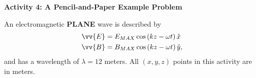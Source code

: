 \pagebreak[2]


\textbf{Activity 4: A Pencil-and-Paper Example Problem}

An electromagnetic \textbf{PLANE} wave is described by
\begin{align*}
\vv {E} &= E_{MAX} \cos \left ( kz - \omega t \right ) \hat x\\
\vv {B} &= B_{MAX} \cos \left ( kz - \omega t \right ) \hat y,
\end{align*}
and has a wavelength of $\lambda =12$ meters.  All $(x,y,z)$ points in this activity are in meters.

